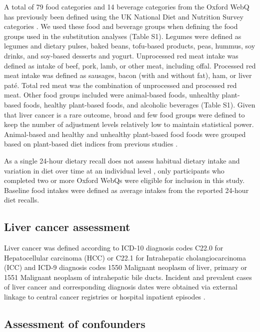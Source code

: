 \documentclass[nutrients,article,submit,moreauthors,pdftex]{Definitions/mdpi}
\begin{document}
A total of 79 food categories and 14 beverage categories from the Oxford
WebQ has previously been defined using the UK National Diet and
Nutrition Survey categories \citep{piernas2021}. We used these food and
beverage groups when defining the food groups used in the substitution
analyses (Table S1). Legumes were defined as legumes and dietary pulses,
baked beans, tofu-based products, peas, hummus, soy drinks, and
soy-based desserts and yogurt. Unprocessed red meat intake was defined
as intake of beef, pork, lamb, or other meat, including offal. Processed
red meat intake was defined as sausages, bacon (with and without fat),
ham, or liver paté. Total red meat was the combination of unprocessed
and processed red meat. Other food groups included were animal-based
foods, unhealthy plant-based foods, healthy plant-based foods, and
alcoholic beverages (Table S1). Given that liver cancer is a rare
outcome, broad and few food groups were defined to keep the number of
adjustment levels relatively low to maintain statistical power.
Animal-based and healthy and unhealthy plant-based food foods were
grouped based on plant-based diet indices from previous studies
\citep{Thompson2023, Heianza2021, Satija2017, Satija2016}.

As a single 24-hour dietary recall does not assess habitual dietary
intake and variation in diet over time at an individual level
\citep{thompson2013, gurinovic2017}, only participants who completed two or
more Oxford WebQs were eligible for inclusion in this study. Baseline
food intakes were defined as average intakes from the reported 24-hour
diet recalls.

\hypertarget{subsec3}{%
\subsection{Liver cancer assessment}\label{subsec3}}

Liver cancer was defined according to ICD-10 diagnosis codes C22.0 for
Hepatocellular carcinoma (HCC) or C22.1 for Intrahepatic
cholangiocarcinoma (ICC) and ICD-9 diagnosis codes 1550 Malignant
neoplasm of liver, primary or 1551 Malignant neoplasm of intrahepatic
bile ducts. Incident and prevalent cases of liver cancer and
corresponding diagnosis dates were obtained via external linkage to
central cancer registries or hospital inpatient episodes \citep{RN112, RN114}.

\hypertarget{subsec4}{%
\subsection{Assessment of confounders}\label{subsec4}}
\end{document}
